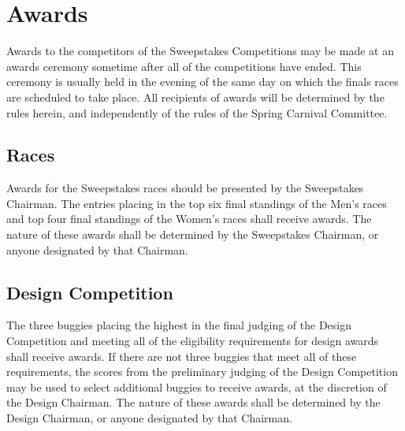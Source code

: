 \chapter{Awards}

	Awards to the competitors of the Sweepstakes Competitions may be made at an
	awards ceremony sometime after all of the competitions have ended. This
	ceremony is usually held in the evening of the same day on which the finals
	races are scheduled to take place. All recipients of awards will be
	determined by the rules herein, and independently of the rules of the Spring
	Carnival Committee.

\section{Races}

	Awards for the Sweepstakes races should be presented by the Sweepstakes
	Chairman. The entries placing in the top six final standings of the
	Men's races and top four final standings of the Women's races shall
	receive awards. The nature of these awards shall be determined by the
	Sweepstakes Chairman, or anyone designated by that Chairman.

\section{Design Competition}

	The three buggies placing the highest in the final judging of the Design
	Competition and meeting all of the eligibility requirements for design
	awards shall receive awards. If there are not three buggies that meet all
	of these requirements, the scores from the preliminary judging of the Design
	Competition may be used to select additional buggies to receive awards, at
	the discretion of the Design Chairman. The nature of these awards shall be
	determined by the Design Chairman, or anyone designated by that Chairman.

